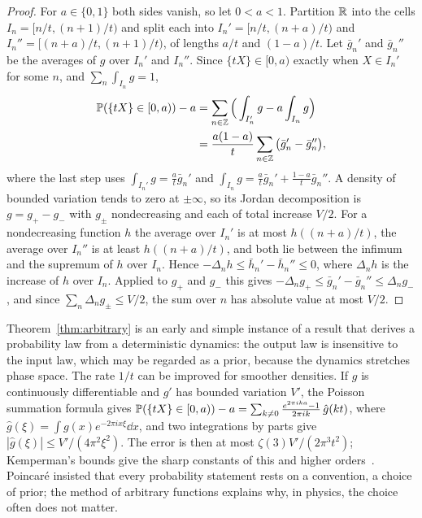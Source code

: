 \begin{proof}
For $a\in\{0,1\}$ both sides vanish, so let $0<a<1$. Partition $\R$ into the cells $I_n = [n/t,(n+1)/t)$ and split each into $I_n' = [n/t,(n+a)/t)$ and $I_n'' = [(n+a)/t,(n+1)/t)$, of lengths $a/t$ and $(1-a)/t$. Let $\bar g_n'$ and $\bar g_n''$ be the averages of $g$ over $I_n'$ and $I_n''$. Since $\{tX\}\in[0,a)$ exactly when $X\in I_n'$ for some $n$, and $\sum_n\int_{I_n}g = 1$,
\[
\begin{aligned}\P(\{tX\}\in[0,a)) - a &= \sum_{n\in\Z}\Big(\int_{I_n'}g - a\int_{I_n}g\Big)\\
&= \frac{a(1-a)}{t}\sum_{n\in\Z}\big(\bar g_n'-\bar g_n''\big),\end{aligned}
\]
where the last step uses $\int_{I_n'}g = \frac at\bar g_n'$ and $\int_{I_n}g = \frac at\bar g_n'+\frac{1-a}t\bar g_n''$. A density of bounded variation tends to zero at $\pm\infty$, so its Jordan decomposition is $g = g_+-g_-$ with $g_\pm$ nondecreasing and each of total increase $V/2$. For a nondecreasing function $h$ the average over $I_n'$ is at most $h((n+a)/t)$, the average over $I_n''$ is at least $h((n+a)/t)$, and both lie between the infimum and the supremum of $h$ over $I_n$. Hence $-\Delta_nh\leq\bar h_n'-\bar h_n''\leq0$, where $\Delta_nh$ is the increase of $h$ over $I_n$. Applied to $g_+$ and $g_-$ this gives $-\Delta_ng_+\leq\bar g_n'-\bar g_n''\leq\Delta_ng_-$, and since $\sum_n\Delta_ng_\pm\leq V/2$, the sum over $n$ has absolute value at most $V/2$.
\end{proof}

Theorem~\ref{thm:arbitrary} is an early and simple instance of a result that derives a probability law from a deterministic dynamics: the output law is insensitive to the input law, which may be regarded as a prior, because the dynamics stretches phase space. The rate $1/t$ can be improved for smoother densities. If $g$ is continuously differentiable and $g'$ has bounded variation $V'$, the Poisson summation formula gives $\P(\{tX\}\in[0,a)) - a = \sum_{k\neq0}\frac{e^{2\pi ika}-1}{2\pi ik}\,\hat g(kt)$, where $\hat g(\xi) = \int g(x)e^{-2\pi ix\xi}\dd x$, and two integrations by parts give $|\hat g(\xi)|\leq V'/(4\pi^2\xi^2)$. The error is then at most $\zeta(3)V'/(2\pi^3t^2)$; Kemperman's bounds give the sharp constants of this and higher orders~\cite[Chapter~3]{engel1992}. Poincar\'e insisted that every probability statement rests on a convention, a choice of prior; the method of arbitrary functions explains why, in physics, the choice often does not matter.


